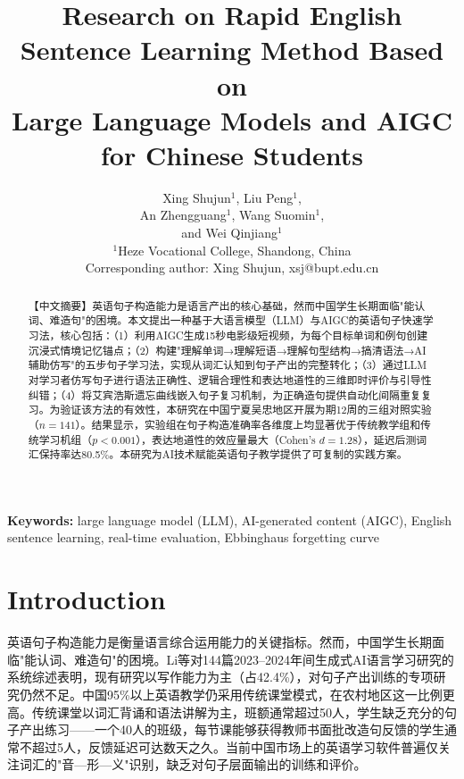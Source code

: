 \documentclass[12pt,a4paper]{ctexart}
\newcommand{\keywords}[1]{\par\noindent\textbf{Keywords:} #1\par\vspace{0.3cm}}
\begin{document}
\date{}

\title{Research on Rapid English Sentence Learning Method Based on\\ Large Language Models and AIGC for Chinese Students}

\author{Xing Shujun$^{1}$, Liu Peng$^{1}$,\\
An Zhengguang$^{1}$, Wang Suomin$^{1}$,\\
and Wei Qinjiang$^{1}$\\[0.3cm]
$^{1}$Heze Vocational College, Shandong, China\\[0.3cm]
Corresponding author: Xing Shujun, xsj@bupt.edu.cn}

\begin{abstract}
【中文摘要】英语句子构造能力是语言产出的核心基础，然而中国学生长期面临"能认词、难造句"的困境。本文提出一种基于大语言模型（LLM）与AIGC的英语句子快速学习法，核心包括：（1）利用AIGC生成15秒电影级短视频，为每个目标单词和例句创建沉浸式情境记忆锚点；（2）构建"理解单词→理解短语→理解句型结构→搞清语法→AI辅助仿写"的五步句子学习法，实现从词汇认知到句子产出的完整转化；（3）通过LLM对学习者仿写句子进行语法正确性、逻辑合理性和表达地道性的三维即时评价与引导性纠错；（4）将艾宾浩斯遗忘曲线嵌入句子复习机制，为正确造句提供自动化间隔重复复习。为验证该方法的有效性，本研究在中国宁夏吴忠地区开展为期12周的三组对照实验（$n=141$）。结果显示，实验组在句子构造准确率各维度上均显著优于传统教学组和传统学习机组（$p<0.001$），表达地道性的效应量最大（Cohen's $d=1.28$），延迟后测词汇保持率达80.5\%。本研究为AI技术赋能英语句子教学提供了可复制的实践方案。
\end{abstract}

\keywords{large language model (LLM), AI-generated content (AIGC), English sentence learning, real-time evaluation, Ebbinghaus forgetting curve}

\maketitle


\section{Introduction}  %

英语句子构造能力是衡量语言综合运用能力的关键指标。然而，中国学生长期面临"能认词、难造句"的困境。Li等\cite{li2025twoyears}对144篇2023--2024年间生成式AI语言学习研究的系统综述表明，现有研究以写作能力为主（占42.4\%），对句子产出训练的专项研究仍然不足。中国95\%以上英语教学仍采用传统课堂模式，在农村地区这一比例更高。传统课堂以词汇背诵和语法讲解为主，班额通常超过50人\cite{wang2011large}，学生缺乏充分的句子产出练习——一个40人的班级，每节课能够获得教师书面批改造句反馈的学生通常不超过5人，反馈延迟可达数天之久。当前中国市场上的英语学习软件普遍仅关注词汇的"音—形—义"识别，缺乏对句子层面输出的训练和评价。
\end{document}
